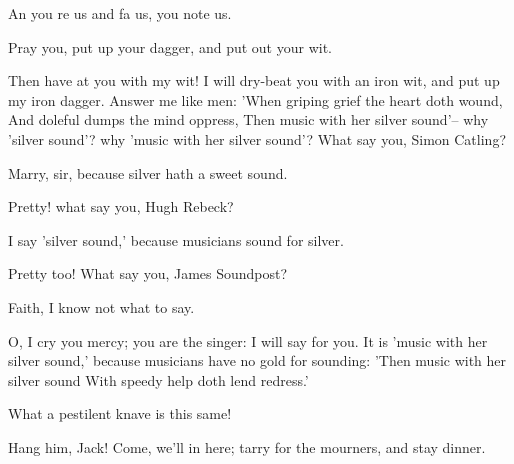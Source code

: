 \begin{speech}
An you re us and fa us, you
 note us.
\end{speech}
\begin{speech}
Pray you, put up your dagger,
 and put out your wit.
\end{speech}
\begin{speech}
Then have at you with my wit! I will
 dry-beat you with an iron wit, and put up my
 iron dagger.   Answer me like men:
'When griping grief the heart doth wound,
And doleful dumps the mind oppress,
Then music with her silver sound'--
 why 'silver sound'? why 'music with her
 silver sound'?   What say you, Simon Catling?
\end{speech}
\begin{speech}
Marry, sir, because silver hath
 a sweet sound.
\end{speech}
\begin{speech}
Pretty! what say you, Hugh Rebeck?
\end{speech}
\begin{speech}
I say 'silver sound,' because
 musicians sound for silver.
\end{speech}
\begin{speech}
Pretty too!   What say you, James
Soundpost?
\end{speech}
\begin{speech}
Faith, I know not what to say.
\end{speech}
\begin{speech}
O, I cry you mercy; you are the
 singer: I will say for you. It is 'music with
her silver sound,' because musicians have no
gold for sounding:
'Then music with her silver sound
With speedy help doth lend redress.' 
\end{speech}
\begin{speech}
What a pestilent knave is this
same!
\end{speech}
\begin{speech}
Hang him, Jack!   Come, we'll
in here; tarry for the mourners, and stay
dinner. 
\end{speech}




